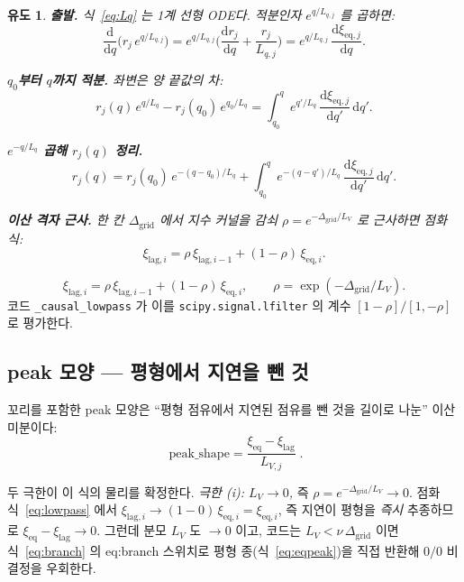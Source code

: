 \documentclass[11pt,a4paper]{article}
\newtheorem*{derivebox}{유도}
\newcommand{\dd}{\mathrm{d}}
\newcommand{\eq}{\mathrm{eq}}
\newcommand{\code}[1]{\texttt{#1}}
\begin{document}
\begin{derivebox}
\textbf{출발.} 식~\eqref{eq:Lq} 는 1계 선형 ODE다. 적분인자 $e^{q/L_{q,j}}$ 를 곱하면:
\begin{equation*}
\frac{\dd}{\dd q}\Big(r_j\,e^{q/L_{q,j}}\Big)
=e^{q/L_{q,j}}\Big(\frac{\dd r_j}{\dd q}+\frac{r_j}{L_{q,j}}\Big)
=e^{q/L_{q,j}}\,\frac{\dd\xi_{\eq,j}}{\dd q}.
\end{equation*}

\textbf{$q_0$부터 $q$까지 적분.} 좌변은 양 끝값의 차:
\begin{equation*}
r_j(q)\,e^{q/L_q}-r_j(q_0)\,e^{q_0/L_q}
=\int_{q_0}^q e^{q'/L_q}\,\frac{\dd\xi_{\eq,j}}{\dd q'}\,\dd q'.
\end{equation*}

\textbf{$e^{-q/L_q}$ 곱해 $r_j(q)$ 정리.}
\begin{equation*}
r_j(q)=r_j(q_0)\,e^{-(q-q_0)/L_q}
+\int_{q_0}^q e^{-(q-q')/L_q}\,\frac{\dd\xi_{\eq,j}}{\dd q'}\,\dd q'.
\end{equation*}

\textbf{이산 격자 근사.} 한 칸 $\Delta_\mathrm{grid}$ 에서 지수 커널을 감쇠 $\rho=e^{-\Delta_\mathrm{grid}/L_V}$ 로 근사하면 점화식:
\begin{equation*}
\xi_{\mathrm{lag},i}=\rho\,\xi_{\mathrm{lag},i-1}+(1-\rho)\,\xi_{\eq,i}.
\end{equation*}
\end{derivebox}
\begin{equation}
\xi_{\mathrm{lag},i}=\rho\,\xi_{\mathrm{lag},i-1}+(1-\rho)\,\xi_{\eq,i},
\qquad\rho=\exp(-\Delta_\mathrm{grid}/L_V).
\label{eq:lowpass}
\end{equation}
코드 \code{\_causal\_lowpass} 가 이를 \code{scipy.signal.lfilter} 의 계수 $[1-\rho]/[1,-\rho]$ 로 평가한다.

\subsection{peak 모양 — 평형에서 지연을 뺀 것}

꼬리를 포함한 peak 모양은 ``평형 점유에서 지연된 점유를 뺀 것을 길이로 나눈'' 이산 미분이다:
\begin{equation}
\boxed{\;\text{peak\_shape}=\frac{\xi_{\eq}-\xi_{\mathrm{lag}}}{L_{V,j}}\;.}
\label{eq:peakshape}
\end{equation}

두 극한이 이 식의 물리를 확정한다.
\emph{극한 (i): $L_V\to0$,} 즉 $\rho=e^{-\Delta_\mathrm{grid}/L_V}\to0$. 점화식~\eqref{eq:lowpass} 에서
$\xi_{\mathrm{lag},i}\to(1-0)\,\xi_{\eq,i}=\xi_{\eq,i}$, 즉 지연이 평형을 \emph{즉시} 추종하므로
$\xi_\eq-\xi_\mathrm{lag}\to0$. 그런데 분모 $L_V$ 도 $\to0$ 이고, 코드는 $L_V<\nu\,\Delta_\mathrm{grid}$ 이면
식~\eqref{eq:branch} 의 eq:branch 스위치로 평형 종(식~\eqref{eq:eqpeak})을 직접 반환해 $0/0$ 비결정을 우회한다.
\end{document}
